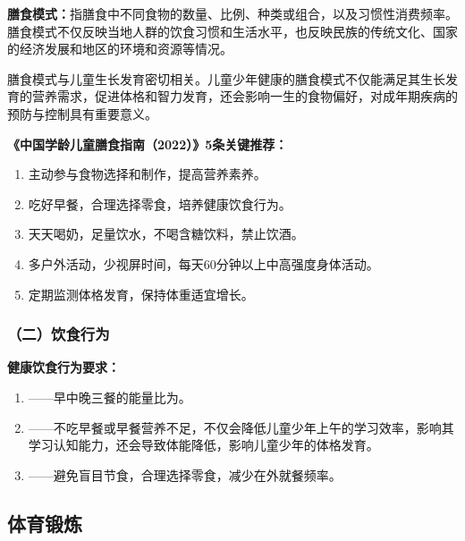 \begin{keybox}
\textbf{膳食模式：}指膳食中不同食物的数量、比例、种类或组合，以及习惯性消费频率。膳食模式不仅反映当地人群的饮食习惯和生活水平，也反映民族的传统文化、国家的经济发展和地区的环境和资源等情况。

膳食模式与儿童生长发育密切相关。儿童少年健康的膳食模式不仅能满足其生长发育的营养需求，促进体格和智力发育，还会影响一生的食物偏好，对成年期疾病的预防与控制具有重要意义。

\textbf{《中国学龄儿童膳食指南（2022）》5条关键推荐：}
\begin{enumerate}[leftmargin=*]
    \item 主动参与食物选择和制作，提高营养素养。
    \item 吃好早餐，合理选择零食，培养健康饮食行为。
    \item 天天喝奶，足量饮水，不喝含糖饮料，禁止饮酒。
    \item 多户外活动，少视屏时间，每天60分钟以上中高强度身体活动。
    \item 定期监测体格发育，保持体重适宜增长。
\end{enumerate}
\end{keybox}

\subsubsection{（二）饮食行为}

\begin{keybox}
\textbf{健康饮食行为要求：}
\begin{enumerate}[leftmargin=*]
    \item {}——早中晚三餐的能量比为。
    \item {}——不吃早餐或早餐营养不足，不仅会降低儿童少年上午的学习效率，影响其学习认知能力，还会导致体能降低，影响儿童少年的体格发育。
    \item {}——避免盲目节食，合理选择零食，减少在外就餐频率。
\end{enumerate}
\end{keybox}

\subsection{体育锻炼}

